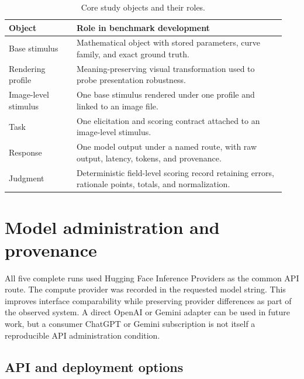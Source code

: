 \documentclass[11pt]{article}
\begin{document}
\begin{table}[H]
\centering
\caption{Core study objects and their roles.}
\begin{tabularx}{\linewidth}{p{0.23\linewidth}p{0.71\linewidth}}
\toprule
Object & Role in benchmark development \\
\midrule
Base stimulus & Mathematical object with stored parameters, curve family, and exact ground truth. \\
Rendering profile & Meaning-preserving visual transformation used to probe presentation robustness. \\
Image-level stimulus & One base stimulus rendered under one profile and linked to an image file. \\
Task & One elicitation and scoring contract attached to an image-level stimulus. \\
Response & One model output under a named route, with raw output, latency, tokens, and provenance. \\
Judgment & Deterministic field-level scoring record retaining errors, rationale points, totals, and normalization. \\
\bottomrule
\end{tabularx}
\end{table}

\section{Model administration and provenance}

All five complete runs used Hugging Face Inference Providers as the common API route. The compute provider was recorded in the requested model string. This improves interface comparability while preserving provider differences as part of the observed system. A direct OpenAI or Gemini adapter can be used in future work, but a consumer ChatGPT or Gemini subscription is not itself a reproducible API administration condition.

\subsection{API and deployment options}
\end{document}
